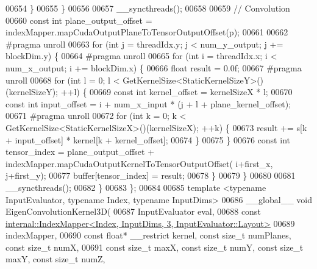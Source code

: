 \begin{DoxyCode}
00654       \}
00655     \}
00656 
00657     \_\_syncthreads();
00658 
00659     \textcolor{comment}{// Convolution}
00660     \textcolor{keyword}{const} \textcolor{keywordtype}{int} plane\_output\_offset = indexMapper.mapCudaOutputPlaneToTensorOutputOffset(p);
00661 
00662 \textcolor{preprocessor}{    #pragma unroll}
00663     \textcolor{keywordflow}{for} (\textcolor{keywordtype}{int} j = threadIdx.y; j < num\_y\_output; j += blockDim.y) \{
00664 \textcolor{preprocessor}{      #pragma unroll}
00665       \textcolor{keywordflow}{for} (\textcolor{keywordtype}{int} i = threadIdx.x; i < num\_x\_output; i += blockDim.x) \{
00666         \textcolor{keywordtype}{float} result = 0.0f;
00667 \textcolor{preprocessor}{        #pragma unroll}
00668         \textcolor{keywordflow}{for} (\textcolor{keywordtype}{int} l = 0; l < GetKernelSize<StaticKernelSizeY>()(kernelSizeY); ++l) \{
00669           \textcolor{keyword}{const} \textcolor{keywordtype}{int} kernel\_offset = kernelSizeX * l;
00670           \textcolor{keyword}{const} \textcolor{keywordtype}{int} input\_offset = i + num\_x\_input * (j + l + plane\_kernel\_offset);
00671 \textcolor{preprocessor}{          #pragma unroll}
00672           \textcolor{keywordflow}{for} (\textcolor{keywordtype}{int} k = 0; k < GetKernelSize<StaticKernelSizeX>()(kernelSizeX); ++k) \{
00673             result += s[k + input\_offset] * kernel[k + kernel\_offset];
00674           \}
00675         \}
00676         \textcolor{keyword}{const} \textcolor{keywordtype}{int} tensor\_index = plane\_output\_offset + indexMapper.mapCudaOutputKernelToTensorOutputOffset(
      i+first\_x, j+first\_y);
00677         buffer[tensor\_index] = result;
00678       \}
00679     \}
00680 
00681     \_\_syncthreads();
00682   \}
00683 \};
00684 
00685 \textcolor{keyword}{template} <\textcolor{keyword}{typename} InputEvaluator, \textcolor{keyword}{typename} Index, \textcolor{keyword}{typename} InputDims>
00686 \_\_global\_\_ \textcolor{keywordtype}{void} EigenConvolutionKernel3D(
00687     InputEvaluator eval,
00688     \textcolor{keyword}{const} \hyperlink{class_eigen_1_1internal_1_1_index_mapper}{internal::IndexMapper<Index, InputDims, 3, InputEvaluator::Layout>}
00689         indexMapper,
00690     \textcolor{keyword}{const} \textcolor{keywordtype}{float}* \_\_restrict kernel, \textcolor{keyword}{const} \textcolor{keywordtype}{size\_t} numPlanes, \textcolor{keyword}{const} \textcolor{keywordtype}{size\_t} numX,
00691     \textcolor{keyword}{const} \textcolor{keywordtype}{size\_t} maxX, \textcolor{keyword}{const} \textcolor{keywordtype}{size\_t} numY, \textcolor{keyword}{const} \textcolor{keywordtype}{size\_t} maxY, \textcolor{keyword}{const} \textcolor{keywordtype}{size\_t} numZ,

\end{DoxyCode}

